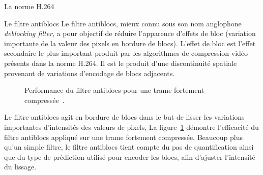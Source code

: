 \documentclass[letterpaper, twoside, 12pt,memoire]{thETS}
\newcommand{\fig}[1]{figure~\ref{#1}}
\begin{document}
\begin{chapter}{La norme H.264}
\begin{section}{Le filtre antiblocs}
Le filtre antiblocs, mieux connu sous son nom anglophone \textit{deblocking
filter}, a pour objectif de réduire l'apparence d'effets de bloc (variation
importante de la valeur des pixels en bordure de blocs). L'effet de bloc est
l'effet secondaire le plus important produit par les algorithmes de compression
vidéo présents dans la norme H.264. Il est le produit d'une discontinuité
spatiale provenant de variations d'encodage de blocs adjacents.

\begin{figure}[htb]

\centering
{}
\caption{Performance du filtre antiblocs pour une trame fortement
compressée~\citep{schafer2003}.}
\label{fig-Deblocking}
\end{figure}

Le filtre antiblocs agit en bordure de blocs dans le but de lisser les
variations importantes d'intensités des valeurs de pixels, La
\fig{fig-Deblocking} démontre l'efficacité du filtre antiblocs appliqué sur une
trame fortement compressée. Beaucoup plus qu'un simple filtre, le filtre
antiblocs tient compte du pas de quantification ainsi que du type de prédiction
utilisé pour encoder les blocs, afin d'ajuster l'intensité du lissage.


\end{section}
\end{chapter}
\end{document}
